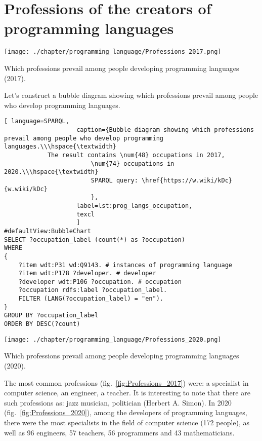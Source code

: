 \section{Professions of the creators of programming languages}

\begin{marginfigure}[-5cm]
	\texttt{[image: ./chapter/programming\_language/Professions\_2017.png]}
	\caption{Which professions prevail among people developing programming languages (2017).}
	\label{fig:Professions_2017}
\end{marginfigure}

Let's construct a bubble diagram showing which professions prevail among people who develop programming languages.

\begin{lstlisting}[ language=SPARQL, 
                    caption={Bubble diagram showing which professions prevail among people who develop programming languages.\\\hspace{\textwidth}
			The result contains \num{48} occupations in 2017, 
                        \num{74} occupations in 2020.\\\hspace{\textwidth}
                        SPARQL query: \href{https://w.wiki/kDc}{w.wiki/kDc}
                        },
                    label=lst:prog_langs_occupation,
                    texcl 
                    ]
#defaultView:BubbleChart
SELECT ?occupation_label (count(*) as ?occupation)
WHERE
{
    ?item wdt:P31 wd:Q9143. # instances of programming language 
    ?item wdt:P178 ?developer. # developer
    ?developer wdt:P106 ?occupation. # occupation
    ?occupation rdfs:label ?occupation_label. 
    FILTER (LANG(?occupation_label) = "en"). 
}
GROUP BY ?occupation_label 
ORDER BY DESC(?count)
\end{lstlisting}%

\begin{marginfigure}
	\texttt{[image: ./chapter/programming\_language/Professions\_2020.png]}
	\caption{Which professions prevail among people developing programming languages (2020).}
	\label{fig:Professions_2020}
\end{marginfigure}

The most common professions (fig.~\ref{fig:Professions_2017}) were: a specialist in computer science, an engineer, a teacher. It is interesting to note that there are such professions as: jazz musician, politician (Herbert A. Simon). In 2020 (fig.~\ref{fig:Professions_2020}), among the developers of programming languages, there were the most specialists in the field of computer science (172 people), as well as 96 engineers, 57 teachers, 56 programmers and 43 mathematicians.

